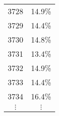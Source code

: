 \documentclass[11pt]{beamer}
\begin{document}
\begin{frame}[label=recap]
\begin{columns}
\begin{column}{5cm}
\begin{center}
{\begin{tabular}{|c|c|}
3728

& 

14.9\%

\\



3729

& 

14.4\%

\\



3730

& 

14.8\%

\\


{\color[rgb]{1,0,0}
3731
}
& 
{\color[rgb]{1,0,0}
13.4\%
}
\\



3732

& 

14.9\%

\\



3733

& 

14.4\%

\\



3734

& 

16.4\%

\\

$\vdots$ & $\vdots$\\
\hline
\end{tabular}

}
\end{center}
\end{column}
\begin{column}{5cm}







\end{column}
\end{columns}
\end{frame}
\end{document}
